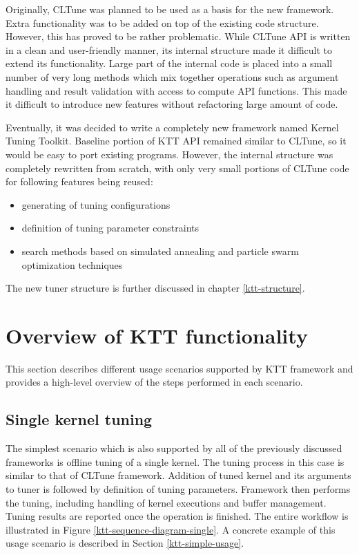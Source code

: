 \documentclass
[
    digital, %
    oneside, %
    table, %
    nolof, %
    nolot, %
    nocover %
]{fithesis3}
\begin{document}
Originally, CLTune was planned to be used as a basis for the new framework. Extra functionality was to be added on top of the existing code structure.
However, this has proved to be rather problematic. While CLTune API is written in a clean and user-friendly manner, its internal structure made it
difficult to extend its functionality. Large part of the internal code is placed into a small number of very long methods which mix together operations
such as argument handling and result validation with access to compute API functions. This made it difficult to introduce new features without refactoring
large amount of code.

Eventually, it was decided to write a completely new framework named Kernel Tuning Toolkit. Baseline portion of KTT API remained similar to CLTune,
so it would be easy to port existing programs. However, the internal structure was completely rewritten from scratch, with only very small portions
of CLTune code for following features being reused:
\begin{itemize}
    \item generating of tuning configurations
    \item definition of tuning parameter constraints
    \item search methods based on simulated annealing and particle swarm optimization techniques
\end{itemize}
The new tuner structure is further discussed in chapter \ref{ktt-structure}.

\section{Overview of KTT functionality}
This section describes different usage scenarios supported by KTT framework and provides a high-level overview of the steps performed in each scenario.

\subsection{Single kernel tuning}
The simplest scenario which is also supported by all of the previously discussed frameworks is offline tuning of a single kernel. The tuning process in
this case is similar to that of CLTune framework. Addition of tuned kernel and its arguments to tuner is followed by definition of tuning parameters.
Framework then performs the tuning, including handling of kernel executions and buffer management. Tuning results are reported once the operation is
finished. The entire workflow is illustrated in Figure \ref{ktt-sequence-diagram-single}. A concrete example of this usage scenario is described in
Section \ref{ktt-simple-usage}.
\end{document}
